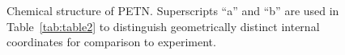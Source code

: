 \documentclass[prb,aps,nobibnotes,twocolumn,doublespace,twocolumngrid,superbib]{revtex4}
\begin{document}
\begin{figure}
\caption{
Chemical structure of PETN.  Superscripts ``a'' and ``b'' are used
in Table~\ref{tab:table2} to distinguish geometrically distinct
internal coordinates for comparison to experiment.
}
\label{fig:petn_2d}
\end{figure}
\end{document}
